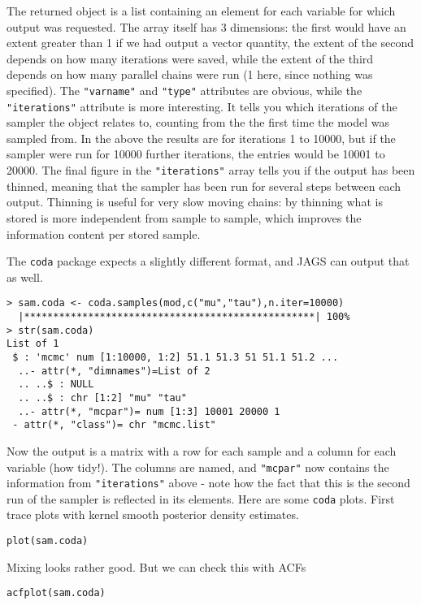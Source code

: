 \documentclass[10pt] {article}
\newcommand{\eps}[3]
{{\begin{center}
 \rotatebox{#1}{\scalebox{#2}{\texttt{[image: \#3]}}}
 \end{center}}
}
\theoremstyle{definition}
\begin{document}
The returned object is a list containing an element for each variable for which output was requested. The array itself has 3 dimensions: the first would have an extent greater than 1 if we had output a vector quantity, the extent of the second depends on how many iterations were saved, while the extent of the third depends on how many parallel chains were run (1 here, since nothing was specified). The \lstinline+"varname"+ and \lstinline+"type"+ attributes are obvious, while the \lstinline+"iterations"+ attribute is more interesting. It tells you which iterations of the sampler the object relates to, counting from the the first time the model was sampled from. In the above the results are for iterations 1 to 10000, but if the sampler were run for 10000 further iterations, the entries would be 10001 to 20000. The final figure in the \lstinline+"iterations"+ array tells you if the output has been thinned, meaning that the sampler has been run for several steps between each output. Thinning is useful for very slow moving chains: by thinning what is stored is more independent from sample to sample, which improves the information content per stored sample. 

The {\tt coda} package expects a slightly different format, and JAGS can output that as well. 
\begin{lstlisting}
> sam.coda <- coda.samples(mod,c("mu","tau"),n.iter=10000)
  |**************************************************| 100%
> str(sam.coda)
List of 1
 $ : 'mcmc' num [1:10000, 1:2] 51.1 51.3 51 51.1 51.2 ...
  ..- attr(*, "dimnames")=List of 2
  .. ..$ : NULL
  .. ..$ : chr [1:2] "mu" "tau"
  ..- attr(*, "mcpar")= num [1:3] 10001 20000 1
 - attr(*, "class")= chr "mcmc.list"
\end{lstlisting}
Now the output is a matrix with a row for each sample and a column for each variable (how tidy!). The columns are named, and \lstinline+"mcpar"+ now contains the information from   \lstinline+"iterations"+ above - note how the fact that this is the second run of the sampler is reflected in its elements. Here are some {\tt coda} plots. First trace plots with kernel smooth posterior density estimates. 
\begin{lstlisting}
plot(sam.coda)
\end{lstlisting}
\eps{-90}{.4}{coda-trace.eps}
Mixing looks rather good. But we can check this with ACFs
\begin{lstlisting}
acfplot(sam.coda)
\end{lstlisting}
\end{document}
